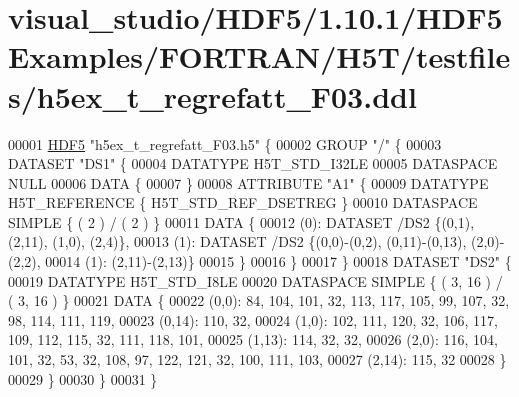 \hypertarget{visual__studio_2_h_d_f5_21_810_81_2_h_d_f5_examples_2_f_o_r_t_r_a_n_2_h5_t_2testfiles_2h5ex__t__regrefatt___f03_8ddl_source}{}\section{visual\+\_\+studio/\+H\+D\+F5/1.10.1/\+H\+D\+F5\+Examples/\+F\+O\+R\+T\+R\+A\+N/\+H5\+T/testfiles/h5ex\+\_\+t\+\_\+regrefatt\+\_\+\+F03.ddl}
\label{visual__studio_2_h_d_f5_21_810_81_2_h_d_f5_examples_2_f_o_r_t_r_a_n_2_h5_t_2testfiles_2h5ex__t__regrefatt___f03_8ddl_source}

\begin{DoxyCode}
00001 \hyperlink{namespace_h_d_f5}{HDF5} \textcolor{stringliteral}{"h5ex\_t\_regrefatt\_F03.h5"} \{
00002 GROUP \textcolor{stringliteral}{"/"} \{
00003    DATASET \textcolor{stringliteral}{"DS1"} \{
00004       DATATYPE  H5T\_STD\_I32LE
00005       DATASPACE  NULL
00006       DATA \{
00007       \}
00008       ATTRIBUTE \textcolor{stringliteral}{"A1"} \{
00009          DATATYPE  H5T\_REFERENCE \{ H5T\_STD\_REF\_DSETREG \}
00010          DATASPACE  SIMPLE \{ ( 2 ) / ( 2 ) \}
00011          DATA \{
00012          (0): DATASET /DS2 \{(0,1), (2,11), (1,0), (2,4)\},
00013          (1): DATASET /DS2 \{(0,0)-(0,2), (0,11)-(0,13), (2,0)-(2,2),
00014          (1):  (2,11)-(2,13)\}
00015          \}
00016       \}
00017    \}
00018    DATASET \textcolor{stringliteral}{"DS2"} \{
00019       DATATYPE  H5T\_STD\_I8LE
00020       DATASPACE  SIMPLE \{ ( 3, 16 ) / ( 3, 16 ) \}
00021       DATA \{
00022       (0,0): 84, 104, 101, 32, 113, 117, 105, 99, 107, 32, 98, 114, 111, 119,
00023       (0,14): 110, 32,
00024       (1,0): 102, 111, 120, 32, 106, 117, 109, 112, 115, 32, 111, 118, 101,
00025       (1,13): 114, 32, 32,
00026       (2,0): 116, 104, 101, 32, 53, 32, 108, 97, 122, 121, 32, 100, 111, 103,
00027       (2,14): 115, 32
00028       \}
00029    \}
00030 \}
00031 \}
\end{DoxyCode}
